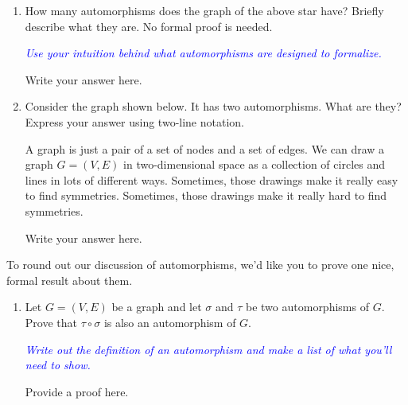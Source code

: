 \documentclass{article}
\renewcommand{\(}{\left(}
\renewcommand{\)}{\right)}
\theoremstyle{plain}
\theoremstyle{plain}
\theoremstyle{definition}
\newcommand{\annotate}[1]{\textit{\textcolor{blue}{#1}}}
\begin{document}
\begin{enumerate}[resume*]
    \item How many automorphisms does the graph of the above star have? Briefly describe what they are. No formal proof is needed.
    
    \annotate{Use your intuition behind what automorphisms are designed to formalize.}
    
    \begin{shaded}
    Write your answer here.
    \end{shaded}
    
    \item Consider the graph shown below. It has two automorphisms. What are they? Express your answer using two-line notation.

    \begin{center}
    \begin{minipage}{0.5\textwidth}
    \end{minipage}
    \end{center}
    
    A graph is just a pair of a set of nodes and a set of edges. We can draw a graph $G = (V, E)$ in two-dimensional space as a collection of circles and lines in lots of different ways. Sometimes, those drawings make it really easy to find symmetries. Sometimes, those drawings make it really hard to find symmetries.
    
    \begin{shaded}
    Write your answer here.
    \end{shaded}
    
\end{enumerate}

To round out our discussion of automorphisms, we'd like you to prove one nice, formal result about them.

\begin{enumerate}[resume*]
    \item Let $G = (V, E)$ be a graph and let $\sigma$ and $\tau$ be two automorphisms of $G$. Prove that $\tau \circ \sigma$ is also an automorphism of $G$.
    
    \annotate{Write out the definition of an automorphism and make a list of what you'll need to show.}
    
    \begin{shaded}
    Provide a proof here.
    \end{shaded}
\end{enumerate}
\end{document}
